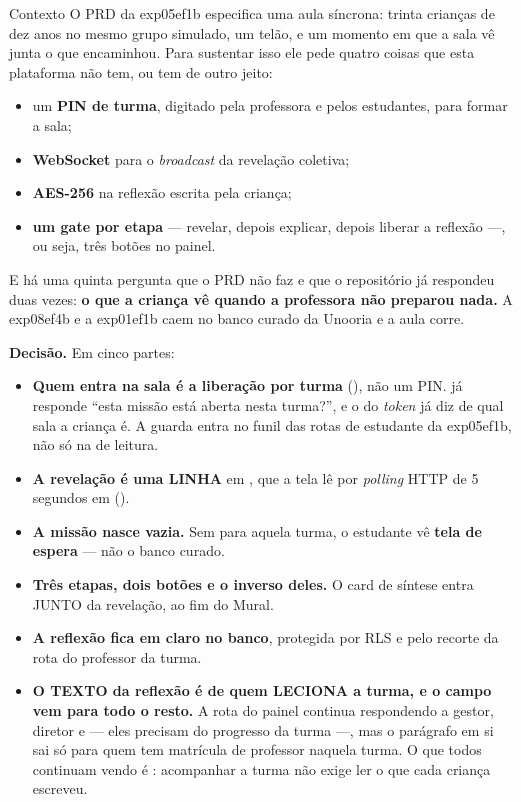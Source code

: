 \begin{especificacao}{Contexto}
O PRD da exp05ef1b especifica uma aula síncrona: trinta crianças de dez anos no
mesmo grupo simulado, um telão, e um momento em que a sala vê junta o que
encaminhou. Para sustentar isso ele pede quatro coisas que esta plataforma não
tem, ou tem de outro jeito:

\begin{itemize}
  \item um \textbf{PIN de turma}, digitado pela professora e pelos estudantes,
    para formar a sala;
  \item \textbf{WebSocket} para o \emph{broadcast} da revelação coletiva;
  \item \textbf{AES-256} na reflexão escrita pela criança;
  \item \textbf{um gate por etapa} --- revelar, depois explicar, depois liberar a
    reflexão ---, ou seja, três botões no painel.
\end{itemize}

E há uma quinta pergunta que o PRD não faz e que o repositório já respondeu duas
vezes: \textbf{o que a criança vê quando a professora não preparou nada.} A
exp08ef4b e a exp01ef1b caem no banco curado da Unooria e a aula corre.
\end{especificacao}

\textbf{Decisão.} Em cinco partes:

\begin{itemize}
  \item \textbf{Quem entra na sala é a liberação por turma} (), não
    um PIN.  já responde \enquote{esta missão está
    aberta nesta turma?}, e o  do \emph{token} já diz de qual sala
    a criança é. A guarda entra no funil das rotas de estudante da exp05ef1b, não só
    na de leitura.
  \item \textbf{A revelação é uma LINHA} em , que a
    tela lê por \emph{polling} HTTP de 5 segundos em
     ().
  \item \textbf{A missão nasce vazia.} Sem  para
    aquela turma, o estudante vê \textbf{tela de espera} --- não o banco curado.
  \item \textbf{Três etapas, dois botões e o inverso deles.} O card de síntese
    entra JUNTO da revelação, ao fim do Mural.
  \item \textbf{A reflexão fica em claro no banco}, protegida por RLS e pelo
    recorte da rota do professor da turma.
  \item \textbf{O TEXTO da reflexão é de quem LECIONA a turma, e o campo vem
     para todo o resto.} A rota do painel continua respondendo a
    gestor, diretor e  --- eles precisam do progresso da turma ---,
    mas o parágrafo em si sai só para quem tem matrícula de professor naquela
    turma. O que todos continuam vendo é : acompanhar a
    turma não exige ler o que cada criança escreveu.
\end{itemize}

